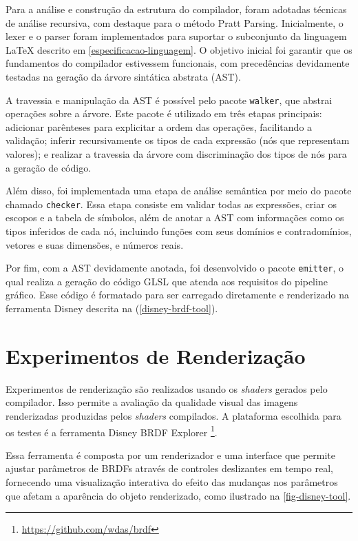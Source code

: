 Para a análise e construção da estrutura do compilador, foram adotadas técnicas de análise recursiva, com destaque para o método Pratt Parsing. Inicialmente, o lexer e o parser foram implementados para suportar o subconjunto da linguagem \LaTeX{} descrito em \autoref{especificacao-linguagem}. O objetivo inicial foi garantir que os fundamentos do compilador estivessem funcionais, com precedências devidamente testadas na geração da árvore sintática abstrata (AST).

A travessia e manipulação da AST é possível pelo pacote \texttt{walker}, que abstrai operações sobre a árvore. Este pacote é utilizado em três etapas principais: adicionar parênteses para explicitar a ordem das operações, facilitando a validação; inferir recursivamente os tipos de cada expressão (nós que representam valores); e realizar a travessia da árvore com discriminação dos tipos de nós para a geração de código.


Além disso, foi implementada uma etapa de análise semântica por meio do pacote chamado \texttt{checker}. Essa etapa consiste em validar todas as expressões, criar os escopos e a tabela de símbolos, além de anotar a AST com informações como os tipos inferidos de cada nó, incluindo funções com seus domínios e contradomínios, vetores e suas dimensões, e números reais.

Por fim, com a AST devidamente anotada, foi desenvolvido o pacote \texttt{emitter}, o qual realiza a geração do código GLSL que atenda aos requisitos do pipeline gráfico. Esse código é formatado para ser carregado diretamente e renderizado na ferramenta Disney descrita na (\autoref{disney-brdf-tool}).

\section{Experimentos de Renderização} \label{experimentos-renderizacao}


Experimentos de renderização são realizados usando os \textit{shaders} gerados pelo compilador. Isso permite a avaliação da qualidade visual das imagens renderizadas produzidas pelos \textit{shaders} compilados. A plataforma escolhida para os testes é a ferramenta \label{disney-brdf-tool} Disney BRDF Explorer \footnote{\url{https://github.com/wdas/brdf}}.


Essa ferramenta é composta por um renderizador e uma interface que permite ajustar parâmetros de BRDFs através de controles deslizantes em tempo real, fornecendo uma visualização interativa do efeito das mudanças nos parâmetros que afetam a aparência do objeto renderizado, como ilustrado na \autoref{fig-disney-tool}.

